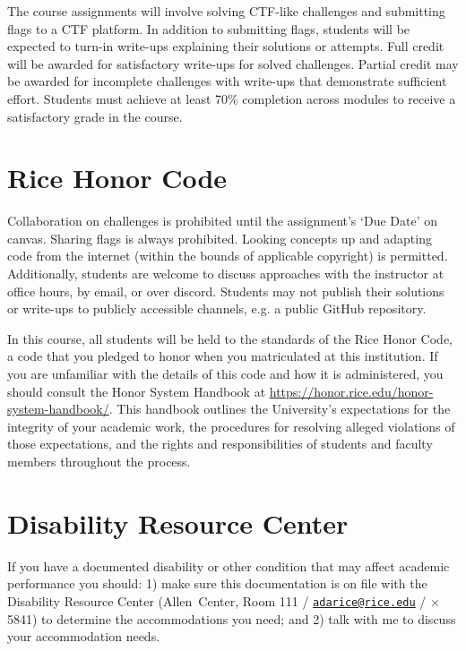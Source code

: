 \documentclass[11pt]{article}
\begin{document}
\begin{flushleft}
The course assignments will involve solving CTF-like challenges and submitting flags to a CTF platform. In addition to submitting flags, students will be expected to turn-in write-ups explaining their solutions or attempts. Full credit will be awarded for satisfactory write-ups for solved challenges. Partial credit may be awarded for incomplete challenges with write-ups that demonstrate sufficient effort. Students must achieve at least 70\% completion across modules to receive a satisfactory grade in the course.

\section{Rice Honor Code}\label{rice-honor-code}

Collaboration on challenges is prohibited until the assignment's `Due Date' on canvas. Sharing flags is always prohibited. Looking concepts up and adapting code from the internet (within the bounds of applicable copyright) is permitted. Additionally, students are welcome to discuss approaches with the instructor at office hours, by email, or over discord. Students may not publish their solutions or write-ups to publicly accessible channels, e.g. a public GitHub repository.

In this course, all students will be held to the standards of the Rice
Honor Code, a code that you pledged to honor when you matriculated at
this institution. If you are unfamiliar with the details of this code
and how it is administered, you should consult the Honor System Handbook
at \url{https://honor.rice.edu/honor-system-handbook/}. This handbook
outlines the University's expectations for the integrity of your
academic work, the procedures for resolving alleged violations of those
expectations, and the rights and responsibilities of students and
faculty members throughout the process.

\section{Disability Resource Center}\label{disability-resource-center}

If you have a documented disability or other condition that may affect
academic performance you should: 1) make sure this documentation is on
file with the Disability Resource Center (Allen~Center, Room 111 /
\href{mailto:adarice@rice.edu}{\texttt{adarice@rice.edu}} / $\times$5841) to determine
the accommodations you need; and 2) talk with me to discuss your
accommodation needs.


\end{flushleft}
\end{document}
